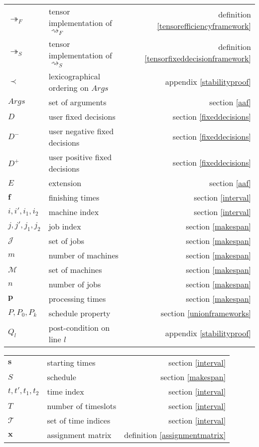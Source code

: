 \begin{tabularx}{\textwidth}{l X r}
	$\twoheadrightarrow_F$ & tensor implementation of $\rightsquigarrow_F$ & definition \ref{tensorefficiencyframework} \\
	$\twoheadrightarrow_S$ & tensor implementation of $\rightsquigarrow_S$ & definition \ref{tensorfixeddecisionframework} \\
	$\prec$ & lexicographical ordering on $Args$ & appendix \ref{stabilityproof} \\
	$Args$ & set of arguments & section \ref{aaf}\\
	$D$ & user fixed decisions & section \ref{fixeddecisions} \\
	$D^-$ & user negative fixed decisions & section \ref{fixeddecisions} \\
	$D^+$ & user positive fixed decisions & section \ref{fixeddecisions} \\
	$E$ & extension & section \ref{aaf} \\
	$\mathbf{f}$ & finishing times & section \ref{interval} \\
	$i,i',i_1,i_2$ & machine index & section \ref{interval} \\
	$j,j',j_1,j_2$ & job index & section \ref{makespan} \\
	$\mathcal{J}$ & set of jobs & section \ref{makespan} \\
	$m$ & number of machines & section \ref{makespan} \\
	$\mathcal{M}$ & set of machines & section \ref{makespan} \\
	$n$ & number of jobs & section \ref{makespan} \\
	$\mathbf{p}$ & processing times & section \ref{makespan} \\
	$P,P_0,P_k$ & schedule property & section \ref{unionframeworks} \\
	$Q_l$ & post-condition on line $l$ & appendix \ref{stabilityproof} \\
\end{tabularx}
\newpage
\begin{tabularx}{\textwidth}{l X r}
	$\mathbf{s}$ & starting times & section \ref{interval} \\
	$S$ & schedule & section \ref{makespan} \\
	$t,t',t_1,t_2$ & time index & section \ref{interval} \\ 
	$T$ & number of timeslots & section \ref{interval} \\
	$\mathcal{T}$ & set of time indices & section \ref{interval} \\
	$\mathbf{x}$ & assignment matrix & definition \ref{assignmentmatrix} \\
\end{tabularx}
